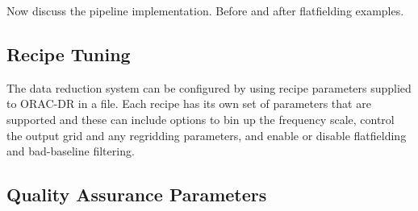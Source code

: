 \documentclass[final,authoryear,5p,times,twocolumn]{elsarticle}
\begin{document}
{\color{red} Now discuss the pipeline implementation. Before and after flatfielding examples.}

\subsection{Recipe Tuning}

The data reduction system can be configured by using recipe parameters
supplied to ORAC-DR in a file. Each recipe has its own set of
parameters that are supported and these can include options to bin up
the frequency scale, control the output grid and any regridding
parameters, and enable or disable flatfielding and bad-baseline filtering.

\subsection{Quality Assurance Parameters \label{sec:qa}}
\end{document}
